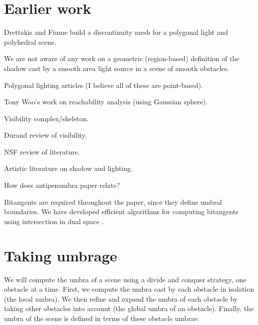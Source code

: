 \documentclass[9pt]{article}
\newif\ifTalk
\begin{document}
\ifTalk
This distinction between point and regional approaches is analogous to the 
two ways for computing a tangent on a Bezier curve:
computing the tangent at a point
or computing the hodograph of the curve, representing all of the tangents.)
\fi


{\tiny
\section{Earlier work}

Drettakis and Fiume \cite{drettakis94}
build a discontinuity mesh for a polygonal light and polyhedral scene.

We are not aware of any work on a geometric (region-based) definition
of the shadow cast by a smooth area light source
in a scene of smooth obstacles.

Polygonal lighting articles (I believe all of these are point-based).

Tony Woo's work on reachability analysis (using Gaussian sphere).

Visibility complex/skeleton.

Durand review of visibility.

NSF review of literature.

Artistic literature on shadow and lighting.

How does antipenumbra paper relate?

Bitangents are required throughout the paper, since they define
umbral boundaries.
We have developed efficient algorithms for computing bitangents
using intersection in dual space \cite{jj01,jj02}.
}	%



\section{Taking umbrage} %

We will compute the umbra of a scene using a divide and conquer strategy,
one obstacle at a time.
First, we compute the umbra cast by each obstacle in isolation
(the local umbra).
We then refine and expand the umbra of each obstacle
by taking other obstacles into account (the global umbra of an obstacle).
Finally, the umbra of the scene is defined in terms of these obstacle umbrae.
\end{document}
